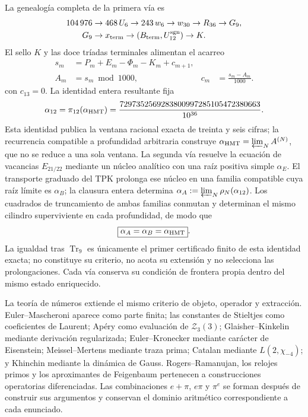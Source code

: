 La genealogía completa de la primera vía es
\[
 \begin{aligned}
 104\,976&\to468\,U_6\to243\,w_6\to w_{30}\to R_{36}\to G_9,\\
 G_9&\to x_{\rm term}\to(B_{\rm term},U_{12}^{\rm sgn})\to K.
 \end{aligned}
\]
El sello \(K\) y las doce tríadas terminales alimentan el acarreo
\[
 \begin{aligned}
 s_m&=P_m+E_m-\Phi_m-K_m+c_{m+1},\\
 A_m&=s_m\bmod1000,
 &c_m&=\frac{s_m-A_m}{1000}.
 \end{aligned}
\]
con \(c_{13}=0\). La identidad entera resultante fija
\[
 \alpha_{12}=\pi_{12}(\alpha_{\rm HMT})
 =\frac{7297352569283800997285105472380663}{10^{36}}.
\]
Esta identidad publica la ventana racional exacta de treinta y seis cifras;
la recurrencia compatible a profundidad arbitraria construye
\(\alpha_{\rm HMT}=\varprojlim_N A^{(N)}\), que no se reduce a una sola
ventana. La segunda vía resuelve la ecuación de vacancias \(E_{21/22}\)
mediante un núcleo analítico con una raíz positiva simple \(\alpha_E\). El
transporte graduado del TPK prolonga ese núcleo en una familia compatible
cuya raíz límite es \(\alpha_B\); la clausura entera determina
\(\alpha_A:=\varprojlim_N\rho_N(\alpha_{12})\). Los cuadrados de truncamiento
de ambas familias conmutan y determinan el mismo cilindro superviviente en
cada profundidad, de modo que
\[
 \boxed{\alpha_A=\alpha_B=\alpha_{\rm HMT}}.
\]
La igualdad tras \(\operatorname{Tr}_9\) es únicamente el primer certificado
finito de esta identidad exacta; no constituye su criterio, no acota su
extensión y no selecciona las prolongaciones. Cada vía conserva su condición
de frontera propia dentro del mismo estado enriquecido.

La teoría de números extiende el mismo criterio de objeto, operador y
extracción. Euler--Mascheroni aparece como parte finita; las constantes de
Stieltjes como coeficientes de Laurent; Apéry como evaluación de
\(\mathcal Z_3(3)\); Glaisher--Kinkelin mediante derivación regularizada;
Euler--Kronecker mediante carácter de Eisenstein; Meissel--Mertens mediante
traza prima; Catalan mediante \(L(2,\chi_{-4})\); y Khinchin mediante la
dinámica de Gauss. Rogers--Ramanujan, los relojes primos y los aproximantes
de Feigenbaum pertenecen a construcciones operatorias diferenciadas. Las
combinaciones \(e+\pi\), \(e\pi\) y \(\pi^e\) se forman después de construir
sus argumentos y conservan el dominio aritmético correspondiente a cada
enunciado.

